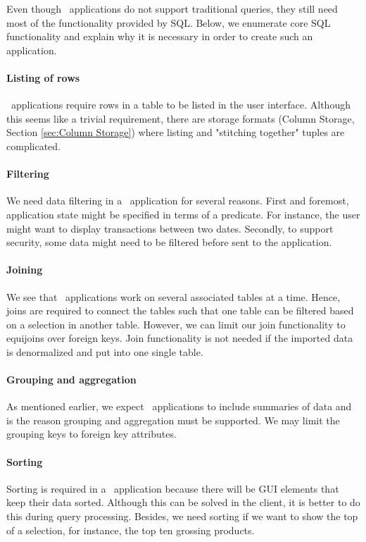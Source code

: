 Even though \bd~applications do not support traditional queries, they still need most of the functionality provided by SQL. Below, we enumerate core SQL functionality and explain why it is necessary in order to create such an application.

\paragraph{Listing of rows}
\bd~applications require rows in a table to be listed in the user interface. Although this seems like a trivial requirement, there are storage formats (Column Storage, Section \ref{sec:Column Storage}) where listing and "stitching together" tuples are complicated. 

\paragraph{Filtering}
We need data filtering in a \bd~application for several reasons. First and foremost, application state might be specified in terms of a predicate. For instance, the user might want to display transactions between two dates. Secondly, to support security, some data might need to be filtered before sent to the application.

\paragraph{Joining}
We see that \bd~applications work on several associated tables at a time. Hence, joins are required to connect the tables such that one table can be filtered based on a selection in another table. However, we can limit our join functionality to equijoins over foreign keys. Join functionality is not needed if the imported data is denormalized and put into one single table.

\paragraph{Grouping and aggregation}
\label{par:Grouping and aggregation}
As mentioned earlier, we expect \bd~applications to include summaries of data and is the reason grouping and aggregation must be supported. We may limit the grouping keys to foreign key attributes.

\paragraph{Sorting}
\label{par:Sorting}
Sorting is required in a \bd~application because there will be GUI elements that keep their data sorted. Although this can be solved in the client, it is better to do this during query processing. Besides, we need sorting if we want to show the top of a selection, for instance, the top ten grossing products.

